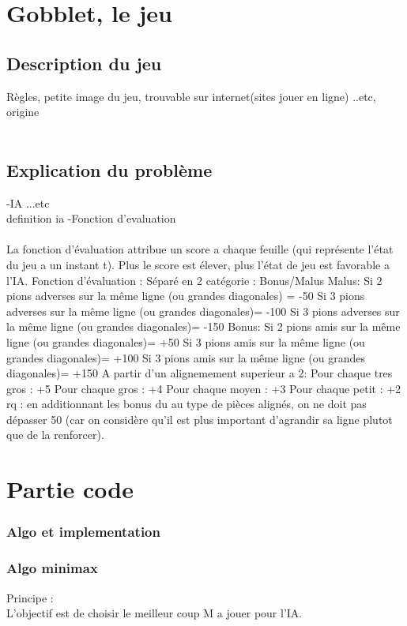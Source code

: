 \documentclass[a4]{article}
\begin{document}
	
	
	
	
	\section{Gobblet, le jeu}
		\subsection{Description du jeu}
				Règles, petite image du jeu, trouvable sur internet(sites jouer en
				ligne) ..etc, origine\\ \\
	
		\subsection{Explication du problème}
				-IA ...etc\\ definition ia
				-Fonction d'evaluation\\ \\
				La fonction d'évaluation attribue un score a chaque feuille (qui représente l'état du jeu a un instant t).
Plus le score est élever, plus l'état de jeu est favorable a l'IA.
Fonction d'évaluation :
	Séparé en 2 catégorie : Bonus/Malus
	Malus:
		Si 2 pions adverses sur la même ligne (ou grandes diagonales) = -50
		Si 3 pions adverses sur la même ligne (ou grandes diagonales)= -100
		Si 3 pions adverses sur la même ligne (ou grandes diagonales)= -150
	Bonus:
		Si 2 pions amis sur la même ligne (ou grandes diagonales)= +50
		Si 3 pions amis sur la même ligne (ou grandes diagonales)= +100
		Si 3 pions amis sur la même ligne (ou grandes diagonales)= +150
			A partir d'un alignemement superieur a 2:
					Pour chaque tres gros : +5
					Pour chaque gros : +4
					Pour chaque moyen : +3
					Pour chaque petit : +2
rq : en additionnant les bonus du au type de pièces alignés, on ne doit pas dépasser 50 (car on considère qu'il est 
plus important d'agrandir sa ligne plutot que de la renforcer).
	\section{Partie code}
					\subsubsection{Algo et implementation}
					
					\subsubsection{Algo minimax}
Principe :\\
L'objectif est de choisir le meilleur coup M a jouer pour l'IA.\\ \\
\end{document}
